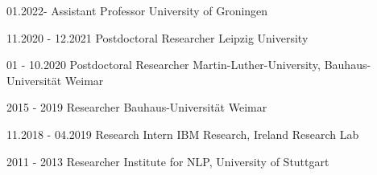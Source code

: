 



\cvevent
{01.2022-}
{Assistant Professor}
{University of Groningen}

\cvevent
{11.2020 - 12.2021}
{Postdoctoral Researcher}
{Leipzig University}

\cvevent
{01 - 10.2020}
{Postdoctoral Researcher}
{Martin-Luther-University, Bauhaus-Universität Weimar}

\cvevent
{2015 - 2019} %
{Researcher} %
{Bauhaus-Universität Weimar}


\cvevent
{11.2018 - 04.2019} %
{Research Intern} %
{IBM Research, Ireland Research Lab} %

\cvevent
{2011 - 2013} %
{Researcher} %
{Institute for NLP, University of Stuttgart}
